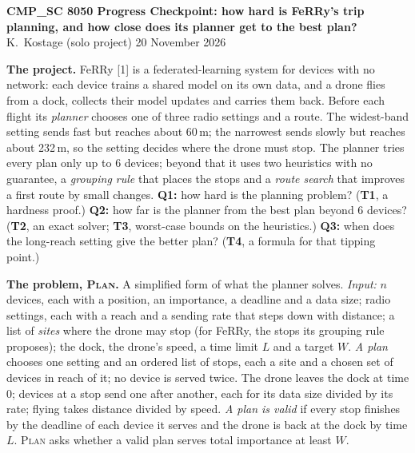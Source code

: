 \documentclass[10pt]{article}
\newcommand{\PLAN}{\textsc{Plan}}
\newcommand{\head}[1]{\par\vspace{3pt}\noindent\textbf{#1}\enspace}
\begin{document}
{\large\textbf{CMP\_SC 8050 Progress Checkpoint: how hard is FeRRy's trip
planning, and how close does its planner get to the best plan?}}\\
K.~Kostage (solo project) \hfill 20 November 2026

\head{The project.} FeRRy [1] is a federated-learning system for devices with
no network: each device trains a shared model on its own data, and a drone
flies from a dock, collects their model updates and carries them back. Before
each flight its \emph{planner} chooses one of three radio settings and a
route. The widest-band setting sends fast but reaches about 60\,m; the
narrowest sends slowly but reaches about 232\,m, so the setting decides where
the drone must stop. The planner tries every plan only up to 6 devices; beyond
that it uses two heuristics with no guarantee, a \emph{grouping rule} that
places the stops and a \emph{route search} that improves a first route by
small changes.
\textbf{Q1:} how hard is the planning problem? (\textbf{T1}, a hardness
proof.)
\textbf{Q2:} how far is the planner from the best plan beyond 6 devices?
(\textbf{T2}, an exact solver; \textbf{T3}, worst-case bounds on the
heuristics.)
\textbf{Q3:} when does the long-reach setting give the better plan?
(\textbf{T4}, a formula for that tipping point.)

\head{The problem, \PLAN.} A simplified form of what the planner solves.
\emph{Input:} $n$ devices, each with a position, an importance, a deadline
and a data size; radio settings, each with a reach and a sending rate that
steps down with distance; a list of
\emph{sites} where the drone may stop (for FeRRy, the stops its grouping rule
proposes); the dock, the drone's speed, a time limit $L$ and a target $W$.
\emph{A plan} chooses one setting and an ordered list of stops, each a site
and a chosen set of devices in reach of it; no device is served twice. The
drone leaves the dock at time $0$; devices at a stop send one after another,
each for its data size divided by its rate; flying takes distance divided by
speed. \emph{A plan is valid} if every stop finishes by the deadline of each
device it serves and the drone is back at the dock by time $L$. \PLAN{} asks
whether a valid plan serves total importance at least $W$.
\end{document}
